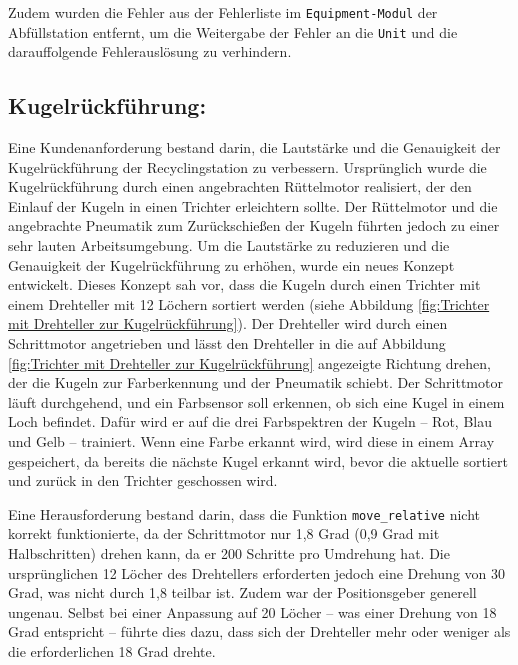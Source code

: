 Zudem wurden die Fehler aus der Fehlerliste im \texttt{Equipment-Modul} der Abfüllstation entfernt, um die Weitergabe der Fehler an die \texttt{Unit} und die darauffolgende Fehlerauslösung zu verhindern.  

\subsection{Kugelrückführung:}
Eine Kundenanforderung bestand darin, die Lautstärke und die Genauigkeit der Kugelrückführung der Recyclingstation zu verbessern. Ursprünglich wurde die Kugelrückführung durch einen angebrachten Rüttelmotor realisiert, der den Einlauf der Kugeln in einen Trichter erleichtern sollte. Der Rüttelmotor und die angebrachte Pneumatik zum Zurückschießen der Kugeln führten jedoch zu einer sehr lauten Arbeitsumgebung. Um die Lautstärke zu reduzieren und die Genauigkeit der Kugelrückführung zu erhöhen, wurde ein neues Konzept entwickelt. Dieses Konzept sah vor, dass die Kugeln durch einen Trichter mit einem Drehteller mit 12 Löchern sortiert werden (siehe Abbildung \ref{fig:Trichter mit Drehteller zur Kugelrückführung}). Der Drehteller wird durch einen Schrittmotor angetrieben und lässt den Drehteller in die auf Abbildung \ref{fig:Trichter mit Drehteller zur Kugelrückführung} angezeigte Richtung drehen, der die Kugeln zur Farberkennung und der Pneumatik schiebt. Der Schrittmotor läuft durchgehend, und ein Farbsensor soll erkennen, ob sich eine Kugel in einem Loch befindet. Dafür wird er auf die drei Farbspektren der Kugeln – Rot, Blau und Gelb – trainiert. Wenn eine Farbe erkannt wird, wird diese in einem Array gespeichert, da bereits die nächste Kugel erkannt wird, bevor die aktuelle sortiert und zurück in den Trichter geschossen wird.  

Eine Herausforderung bestand darin, dass die Funktion \texttt{move\_relative} nicht korrekt funktionierte, da der Schrittmotor nur 1,8 Grad (0,9 Grad mit Halbschritten) drehen kann, da er 200 Schritte pro Umdrehung hat. Die ursprünglichen 12 Löcher des Drehtellers erforderten jedoch eine Drehung von 30 Grad, was nicht durch 1,8 teilbar ist. Zudem war der Positionsgeber generell ungenau. Selbst bei einer Anpassung auf 20 Löcher – was einer Drehung von 18 Grad entspricht – führte dies dazu, dass sich der Drehteller mehr oder weniger als die erforderlichen 18 Grad drehte.  

